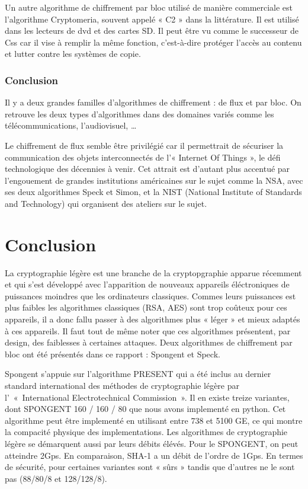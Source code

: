 			Un autre algorithme de chiffrement par bloc utilisé de manière commerciale est l'algorithme Cryptomeria, souvent appelé « C2 » dans la littérature.
			Il est utilisé dans les lecteurs de dvd et des cartes SD. Il peut être vu comme le successeur de Css car il vise à remplir la même fonction, c'est-à-dire protéger l'accès au contenu et lutter contre les systèmes de copie.
			
			\section{Conclusion}
			
			Il y a deux grandes familles d'algorithmes de chiffrement : de flux et par bloc.
			On retrouve les deux types d'algorithmes dans des domaines variés comme les télécommunications, l'audiovisuel, \dots
			
			Le chiffrement de flux semble être privilégié car il permettrait de sécuriser la communication des objets interconnectés de l'« Internet Of Things », le défi technologique des décennies à venir.
			Cet attrait est d'autant plus accentué par l'engouement de grandes institutions américaines sur le sujet comme la NSA, avec ses deux algorithmes Speck et Simon, et la NIST (National Institute of Standards and Technology) qui organisent des ateliers sur le sujet.

\newpage
\part*{Conclusion}

La cryptographie légère est une branche de la cryptopgraphie apparue récemment et qui s'est développé avec l'apparition de nouveaux appareils éléctroniques de puissances moindres que les ordinateurs classiques.
Commes leurs puissances est plus faibles les algorithmes classiques (RSA, AES) sont trop coûteux pour ces appareils, il a donc fallu passer à des algorithmes plus « léger » et mieux adaptés à ces appareils.
Il faut tout de même noter que ces algorithmes présentent, par design, des faiblesses à certaines attaques.
Deux algorithmes de chiffrement par bloc ont été présentés dans ce rapport : Spongent et Speck.

Spongent s'appuie sur l'algorithme PRESENT qui a été inclus au dernier standard international des méthodes de cryptographie légère par l’ « International Electrotechnical Commission ».
Il en existe treize variantes, dont SPONGENT 160 / 160 / 80 que nous avons implementé en python.
Cet algorithme peut être implementé en utilisant entre 738 et 5100 GE, ce qui montre la compacité physique des implementations.
Les algorithmes de cryptographie légère se démarquent aussi par leurs débits élévés. Pour le SPONGENT, on peut atteindre 2Gps.
En comparaison, SHA-1 a un débit de l'ordre de 1Gps.
En termes de sécurité, pour certaines variantes sont « sûrs » tandis que d'autres ne le sont pas (88/80/8 et 128/128/8).

